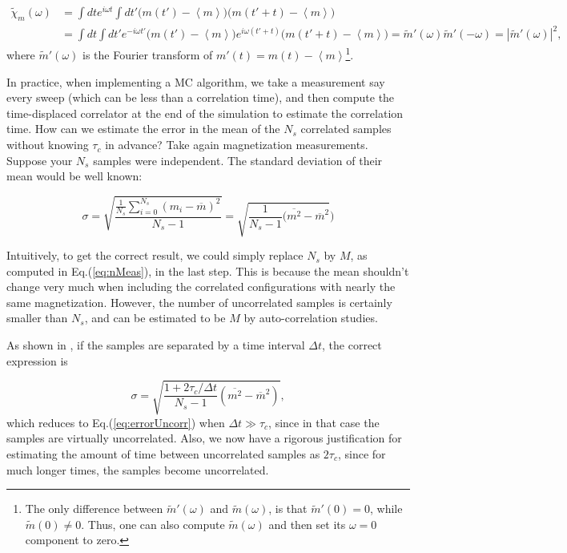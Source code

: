 \begin{equation}
\begin{split}
\tilde{\chi}_m ( \omega ) &= \int dt e^{i\omega t} \int dt' \bigg( m ( t' ) - \left\langle m \right\rangle \bigg) \bigg( m ( t' + t ) - \left\langle m \right\rangle \bigg) \\
&= \int dt \int dt' e^{-i\omega t'} \bigg( m ( t' ) - \left\langle m \right\rangle \bigg) e^{i\omega ( t' + t )} \bigg( m ( t' + t ) - \left\langle m \right\rangle \bigg) = \tilde{m}' (\omega) \tilde{m}' (- \omega) = | \tilde{m}' (\omega) |^2 ,
\end{split} 
\end{equation}
where $\tilde{m}' (\omega)$ is the Fourier transform of $m' (t) = m(t) - \left\langle m \right\rangle$\footnote{The only difference between $\tilde{m}' (\omega)$ and $\tilde{m} (\omega)$, is that $\tilde{m}' (0) = 0$, while $\tilde{m} (0) \neq 0$. Thus, one can also compute $\tilde{m} (\omega)$ and then set its $\omega = 0$ component to zero.}.

In practice, when implementing a MC algorithm, we take a measurement say every sweep (which can be less than a correlation time), and then compute the time-displaced correlator at the end of the simulation to estimate the correlation time.
How can we estimate the error in the mean of the $N_s$ correlated samples without knowing $\tau_c$ in advance?
Take again magnetization measurements.
Suppose your $N_s$ samples were  independent.
The standard deviation of their mean would be well known:

\begin{equation}\label{eq:errorUncorr}
\sigma = \sqrt{ \frac{ \frac{1}{N_s} \sum_{i=0}^{N_s} ( m_i - \overline{m} )^2 }{N_s - 1} } = \sqrt{ \frac{1}{N_s - 1} ( \overline{m^2} - \overline{m}^2 } )
\end{equation}

Intuitively, to get the correct result, we could simply replace $N_s$ by $M$, as computed in Eq.(\ref{eq:nMeas}), in the last step.
This is because the mean shouldn't change very much when including the correlated configurations with nearly the same magnetization.
However, the number of uncorrelated samples is certainly smaller than $N_s$, and can be estimated to be $M$ by auto-correlation studies.

As shown in \cite{muller-krumbhaar_dynamic_1973}, if the samples are separated by a time interval $\Delta t$,  the correct expression is

\begin{equation}\label{eq:errorCorr}
\sigma = \sqrt{ \frac{1 + 2\tau_c / \Delta t}{N_s - 1} ( \overline{m^2} - \overline{m}^2 )  } ,
\end{equation}
which reduces to Eq.(\ref{eq:errorUncorr})  when $\Delta t \gg \tau_c$, since in that case the samples are virtually  uncorrelated.
Also, we now have a rigorous justification for estimating the amount of time between uncorrelated samples as $2\tau_c$, since for much longer times, the samples become uncorrelated.

